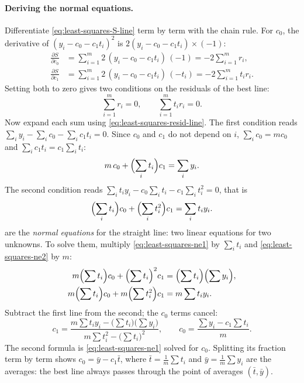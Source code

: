\paragraph{Deriving the normal equations.} Differentiate \cref{eq:least-squares-S-line} term by term with the chain rule. For $c_0$, the derivative of $(y_i - c_0 - c_1 t_i)^2$ is $2(y_i - c_0 - c_1t_i)\times(-1)$:
\begin{align}
\frac{\partial S}{\partial c_0} &= \sum_{i=1}^m 2\,(y_i - c_0 - c_1 t_i)\,(-1) = -2\sum_{i=1}^m r_i, \label{eq:least-squares-dS0}\\
\frac{\partial S}{\partial c_1} &= \sum_{i=1}^m 2\,(y_i - c_0 - c_1 t_i)\,(-t_i) = -2\sum_{i=1}^m t_i r_i . \label{eq:least-squares-dS1}
\end{align}
Setting both to zero gives two conditions on the residuals of the best line:
\begin{equation}
\sum_{i=1}^m r_i = 0, \qquad \sum_{i=1}^m t_i r_i = 0.
\label{eq:least-squares-orth-line}
\end{equation}
Now expand each sum using \cref{eq:least-squares-resid-line}. The first condition reads $\sum_i y_i - \sum_i c_0 - \sum_i c_1 t_i = 0$. Since $c_0$ and $c_1$ do not depend on $i$, $\sum_i c_0 = m c_0$ and $\sum_i c_1 t_i = c_1\sum_i t_i$:
\begin{equation}
m\,c_0 + \Bigl(\sum_i t_i\Bigr)c_1 = \sum_i y_i .
\label{eq:least-squares-ne1}
\end{equation}
The second condition reads $\sum_i t_i y_i - c_0\sum_i t_i - c_1\sum_i t_i^2 = 0$, that is
\begin{equation}
\Bigl(\sum_i t_i\Bigr)c_0 + \Bigl(\sum_i t_i^2\Bigr)c_1 = \sum_i t_i y_i .
\label{eq:least-squares-ne2}
\end{equation}
 are the \emph{normal equations} for the straight line: two linear equations for two unknowns. To solve them, multiply \cref{eq:least-squares-ne1} by $\sum_i t_i$ and \cref{eq:least-squares-ne2} by $m$:
\begin{align*}
m\Bigl(\sum t_i\Bigr)c_0 + \Bigl(\sum t_i\Bigr)^2 c_1 &= \Bigl(\sum t_i\Bigr)\Bigl(\sum y_i\Bigr),\\
m\Bigl(\sum t_i\Bigr)c_0 + m\Bigl(\sum t_i^2\Bigr) c_1 &= m\sum t_iy_i .
\end{align*}
Subtract the first line from the second; the $c_0$ terms cancel:
\begin{equation}
c_1 = \frac{m\sum t_i y_i - \bigl(\sum t_i\bigr)\bigl(\sum y_i\bigr)}{m\sum t_i^2 - \bigl(\sum t_i\bigr)^2},
\qquad
c_0 = \frac{\sum y_i - c_1\sum t_i}{m}.
\label{eq:least-squares-line-sol}
\end{equation}
The second formula is \cref{eq:least-squares-ne1} solved for $c_0$. Splitting its fraction term by term shows $c_0 = \bar y - c_1\bar t$, where $\bar t = \frac1m\sum t_i$ and $\bar y=\frac1m\sum y_i$ are the averages: the best line always passes through the point of averages $(\bar t,\bar y)$.

